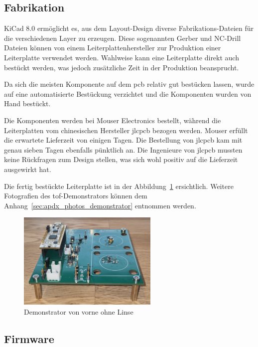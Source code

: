 \subsection{Fabrikation}
KiCad 8.0 ermöglicht es, aus dem Layout-Design diverse Fabrikations-Dateien für die verschiedenen Layer zu erzeugen.
Diese sogenannten Gerber und NC-Drill Dateien können von einem Leiterplattenhersteller zur Produktion einer Leiterplatte
verwendet werden. Wahlweise kann eine Leiterplatte direkt auch bestückt werden, was jedoch zusätzliche Zeit in der Produktion
beansprucht.

Da sich die meisten Komponente auf dem \acrshort{pcb} relativ gut bestücken lassen, wurde auf eine automatisierte Bestückung
verzichtet und die Komponenten wurden von Hand bestückt.

Die Komponenten werden bei Mouser Electronics bestellt, während die Leiterplatten vom chinesischen Hersteller jlcpcb
bezogen werden. Mouser erfüllt die erwartete Lieferzeit von einigen Tagen. Die Bestellung von jlcpcb kam mit genau sieben
Tagen ebenfalls pünktlich an. Die Ingenieure von jlcpcb mussten keine Rückfragen zum Design stellen, was sich wohl positiv
auf die Lieferzeit ausgewirkt hat.

Die fertig bestückte Leiterplatte ist in der Abbildung~\ref{fig:photo_demonstrator_front_wo_lens} ersichtlich. Weitere
Fotografien des \acrshort{tof}-Demonstrators können dem Anhang~\ref{sec:apdx_photos_demonstrator} entnommen werden.

\begin{figure}[H]
    \centering
    \includegraphics[width=0.6\textwidth]{graphics/photo_demonstrator_front_wo_lens.jpg}
    \caption{Demonstrator von vorne ohne Linse}\label{fig:photo_demonstrator_front_wo_lens}
\end{figure}

\subsection{Firmware}

